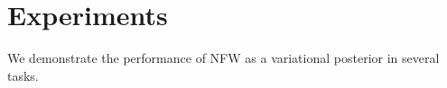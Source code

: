 \documentclass{article}
\newcommand{\acr}[1]{\textsc{#1}\xspace}
\newcommand{\us}{\acr{NFW}}
\begin{document}
\section{Experiments}

We demonstrate the performance of \us as a variational posterior in several tasks. 

\end{document}
